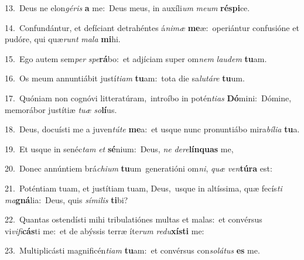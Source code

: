 {\numbfont\textcolor{\numbcolor}{13.}}~Deus ne elon\-\textit{gé}\-\textit{ris} \textbf{a} me:~\star Deus meus, in auxíli\textit{um} \textit{me}\-\textit{um} \textbf{ré}\-\textbf{spi}ce.\par
{\numbfont\textcolor{\numbcolor}{14.}}~Confundántur, et defíciant detrahéntes á\-\textit{ni}\-\textit{mæ} \textbf{me}\-æ:~\star operiántur confusióne et pudóre, qui quæ\textit{runt} \textit{ma}\-\textit{la} \textbf{mi}\-hi.\par
{\numbfont\textcolor{\numbcolor}{15.}}~Ego autem sem\textit{per} \textit{spe}\-\textbf{rá}bo:~\star et adjíciam super om\textit{nem} \textit{lau}\-\textit{dem} \textbf{tu}\-am.\par
{\numbfont\textcolor{\numbcolor}{16.}}~Os meum annuntiábit justí\-\textit{ti}\-\textit{am} \textbf{tu}\-am:~\star tota die sa\-\textit{lu}\-\textit{tá}\textit{re} \textbf{tu}\-um.\par
{\numbfont\textcolor{\numbcolor}{17.}}~Quóniam non cognóvi litteratúram,~\dagger introíbo in potén\-\textit{ti}\-\textit{as} \textbf{Dó}\-mini:~\star Dómine, memorábor justítiæ \textit{tu}\-\textit{æ} \textit{so}\-\textbf{lí}us.\par
{\numbfont\textcolor{\numbcolor}{18.}}~Deus, docuísti me a juven\-\textit{tú}\-\textit{te} \textbf{me}\-a:~\star et usque nunc pronuntiábo mira\-\textit{bí}\-\textit{li}\textit{a} \textbf{tu}\-a.\par
{\numbfont\textcolor{\numbcolor}{19.}}~Et usque in senéc\textit{tam} \textit{et} \textbf{sé}\-nium:~\star Deus, \textit{ne} \textit{de}\-\textit{re}\textbf{lín}\textbf{quas} me,\par
{\numbfont\textcolor{\numbcolor}{20.}}~Donec annúntiem brá\-\textit{chi}\-\textit{um} \textbf{tu}\-um~\star generatióni om\-\textit{ni}\-, \textit{quæ} \textit{ven}\-\textbf{tú}\textbf{ra} est:\par
{\numbfont\textcolor{\numbcolor}{21.}}~Poténtiam tuam, et justítiam tuam, Deus,~\dagger usque in altíssima, quæ fecís\textit{ti} \textit{ma}\-\textbf{gná}lia:~\star Deus, quis \textit{sí}\-\textit{mi}\textit{lis} \textbf{ti}\-bi?\par
{\numbfont\textcolor{\numbcolor}{22.}}~Quantas ostendísti mihi tribulatiónes multas et malas:~\dagger et convérsus vi\-\textit{vi}\-\textit{fi}\textbf{cás}ti me:~\star et de abýssis terræ íte\textit{rum} \textit{re}\-\textit{du}\textbf{xís}\textbf{ti} me:\par
{\numbfont\textcolor{\numbcolor}{23.}}~Multiplicásti magnificén\-\textit{ti}\-\textit{am} \textbf{tu}\-am:~\star et convérsus con\-\textit{so}\-\textit{lá}\textit{tus} \textbf{es} me.\par
